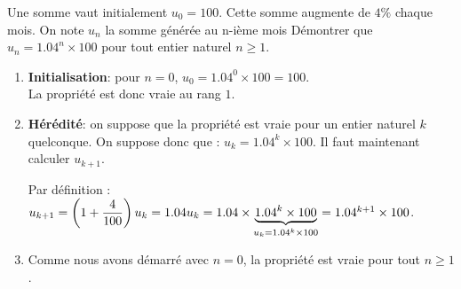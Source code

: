 \begin{example}
Une  somme vaut initialement $ u_0=100 $. Cette  somme  augmente de $ 4\% $   chaque mois. On note $ u_n $ la somme générée au n-ième  mois  Démontrer que $ u_{n} =1.04^{n}\times100$ pour tout entier naturel $ n\geq1 $.
    \begin{enumerate}
        \item \textbf{Initialisation}: pour $n=0$, \; $ u_{0} =1.04^{0} \times 100=100$.\\
                La propriété est donc vraie au rang $1$.
        \item \textbf{Hérédité}: on suppose  que   la propriété est vraie pour un entier  naturel $ k $ quelconque. On suppose donc que :  \;$u_{k} =1.04^{k}\times100 $.\;
        Il faut maintenant calculer $u_{k+1}$.\par
        Par définition : $u_{k+1}=\left(1+\dfrac{4}{100}\right) u_{k}=1.04u_{k}= 1.04\times\underbrace{1.04^{k}\times100}_{u_{k} =1.04^{k}\times100}=1.04^{k+1}\times100$.
 \item Comme nous avons démarré avec $n=0$, la propriété  est vraie pour tout $n \geq1 $.
    \end{enumerate}
\end{example}
 
   